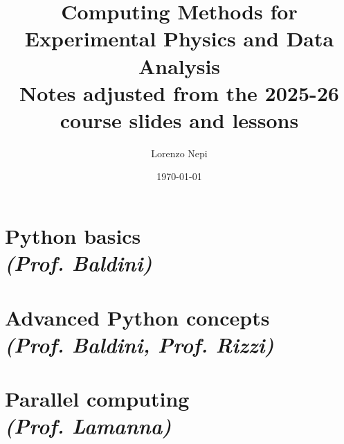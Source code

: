 \documentclass[a4paper, 11pt]{report}
\title{\textbf{Computing Methods for Experimental Physics and Data Analysis} \\
\vspace{0.5em}
{\large Notes adjusted from the 2025-26 course slides and lessons}}
\author{Lorenzo Nepi}
\date{\today}
\begin{document}
\maketitle

\newpage
\thispagestyle{empty}
\null
\newpage

 
\newpage
\tableofcontents
\newpage
{}

\chapter[Python basics]{Python basics \\[0.5ex] \large \textit{(Prof. Baldini)}}










\chapter[Advanced Python concepts]{Advanced Python concepts \\[0.5ex] \large \textit{(Prof. Baldini, Prof. Rizzi)}}






\chapter[Parallel computing]{Parallel computing \\[0.5ex] \large \textit{(Prof. Lamanna)}}
\end{document}
